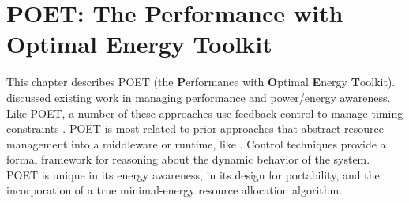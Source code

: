 \chapter{POET: The Performance with Optimal Energy Toolkit}
\label{sec:poet}

This chapter describes POET (the \textbf{P}erformance with \textbf{O}ptimal \textbf{E}nergy \textbf{T}oolkit).
 discussed existing work in managing performance and power/energy awareness.
Like POET, a number of these approaches use feedback control to manage timing constraints \cite{Agilos,Bertini2007,grace2,CoAdapt,Maggio13,TCST,ControlWare,PTRADE,Fu2012,Li2007}.
POET is most related to prior approaches that abstract resource management into a middleware or runtime, like \cite{ControlWare,Sojka,PTRADE,Rajkumar}.
Control techniques provide a formal framework for reasoning about the dynamic behavior of the system.
POET is unique in its energy awareness, in its design for portability, and the incorporation of a true minimal-energy resource allocation algorithm.










